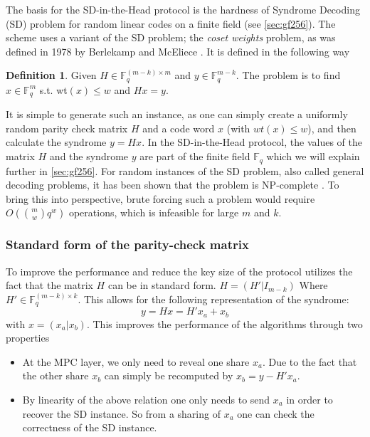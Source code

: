 \documentclass[twoside,11pt,openright]{report}
\theoremstyle{definition}
\newtheorem{definition}{Definition}[section]
\theoremstyle{plain}
\begin{document}
The basis for the SD-in-the-Head protocol is the hardness of Syndrome Decoding (SD) problem for random linear codes on a finite field (see \autoref{sec:gf256}). The scheme uses a variant of the SD problem; the \textit{coset weights} problem, as was defined in 1978 by Berlekamp and McEliece \cite{berlekamp1978inherent}. It is defined in the following way
\begin{definition}
  \label{def:syndrome}
  Given $H \in \mathbb{F}^{(m-k)\times m}_q$ and $y \in \mathbb{F}^{m-k}_q$. The problem is to find $x \in \mathbb{F}^m_q$ s.t. wt$(x) \leq w$ and $Hx = y$.
\end{definition}
It is simple to generate such an instance, as one can simply create a uniformly random parity check matrix $H$ and a code word $x$ (with $wt(x) \leq w$), and then calculate the syndrome $y = Hx$. In the SD-in-the-Head protocol, the values of the matrix $H$ and the syndrome $y$ are part of the finite field $\mathbb{F}_q$ which we will explain further in \autoref{sec:gf256}. For random instances of the SD problem, also called general decoding problems, it has been shown that the problem is NP-complete \cite{berlekamp1978inherent}. To bring this into perspective, brute forcing such a problem would require $O(\binom{m}{w} q^w)$ operations, which is infeasible for large $m$ and $k$.

\subsubsection{Standard form of the parity-check matrix}
\label{sec:standard_form_of_the_parity_check_matrix}
To improve the performance and reduce the key size of the protocol utilizes the fact that the matrix $H$ can be in standard form. $H = (H'|I_{m-k}) $ Where $H' \in \mathbb{F}^{(m-k)\times k}_q$. This allows for the following representation of the syndrome:
\begin{equation}
  y = Hx = H'x_a + x_b
  \label{eq:standard_form_of_the_parity_check_matrix}
\end{equation}
with $x = (x_a | x_b)$. This improves the performance of the algorithms through two properties
\begin{itemize}
  \item At the MPC layer, we only need to reveal one share $x_a$. Due to the fact that the other share $x_b$ can simply be recomputed by $x_b = y - H'x_a$.
  \item By linearity of the above relation one only needs to send $x_a$ in order to recover the SD instance. So from a sharing of $x_a$ one can check the correctness of the SD instance.
\end{itemize}
\end{document}
